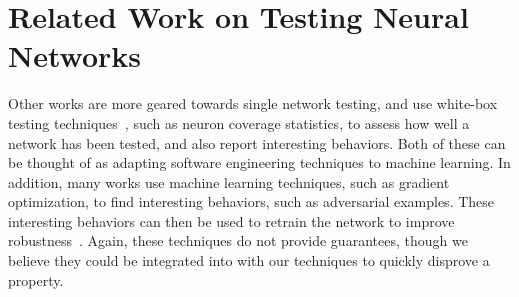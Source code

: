 \section{Related Work on Testing Neural Networks}
Other works are more geared towards single network testing, and use
white-box testing techniques~\cite{ma2018deepgauge, xie2019deephunter,
	SunWRHKK18, TianPJR18, odena2018tensorfuzz}, such as neuron coverage
statistics, to assess how well a network has been tested, and also
report interesting behaviors. Both of these can be thought of as
adapting software engineering techniques to machine learning. In addition, many
works use machine learning techniques, such as
gradient optimization, to find interesting behaviors, such as
adversarial examples\cite{KurakinGB17a, madry2017towards, NguyenYC15,
	XuQE16, Moosavi-Dezfooli16}. These interesting behaviors can then be
used to retrain the network to improve
robustness~\cite{GoodfellowSS15, RaghunathanSL18}. Again, these
techniques do not provide guarantees, though we believe they could be
integrated into with our techniques to quickly disprove a property.